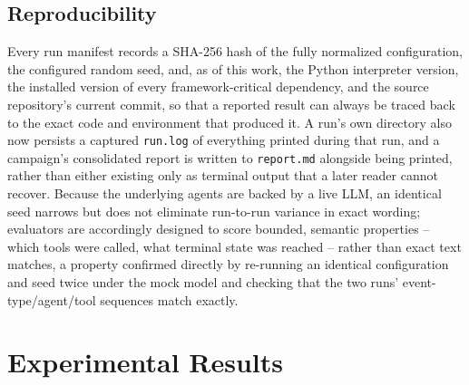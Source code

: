 \documentclass[conference]{IEEEtran}
\begin{document}
\subsection{Reproducibility}
Every run manifest records a SHA-256 hash of the fully normalized configuration, the configured random seed, and, as of this work, the Python interpreter version, the installed version of every framework-critical dependency, and the source repository's current commit, so that a reported result can always be traced back to the exact code and environment that produced it. A run's own directory also now persists a captured \texttt{run.log} of everything printed during that run, and a campaign's consolidated report is written to \texttt{report.md} alongside being printed, rather than either existing only as terminal output that a later reader cannot recover. Because the underlying agents are backed by a live LLM, an identical seed narrows but does not eliminate run-to-run variance in exact wording; evaluators are accordingly designed to score bounded, semantic properties -- which tools were called, what terminal state was reached -- rather than exact text matches, a property confirmed directly by re-running an identical configuration and seed twice under the mock model and checking that the two runs' event-type/agent/tool sequences match exactly.

\section{Experimental Results}
\label{sec:results}
\end{document}
